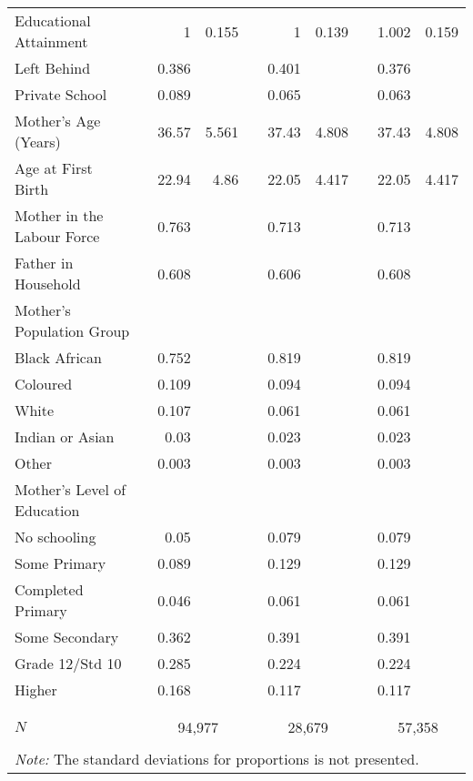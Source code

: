 \begin{table}[t!]
\begin{tabular}{llrrlrrlrr}
  Educational Attainment &  &     1 & 0.155 &  &     1 & 0.139 &  & 1.002 & 0.159 \\ 
  Left Behind &  & 0.386 &  &  & 0.401 &  &  & 0.376 &  \\ 
  Private School &  & 0.089 &  &  & 0.065 &  &  & 0.063 &  \\ 
  Mother's Age (Years) &  & 36.57 & 5.561 &  & 37.43 & 4.808 &  & 37.43 & 4.808 \\ 
  Age at First Birth &  & 22.94 &  4.86 &  & 22.05 & 4.417 &  & 22.05 & 4.417 \\ 
  Mother in the Labour Force &  & 0.763 &  &  & 0.713 &  &  & 0.713 &  \\ 
  Father in Household &  & 0.608 &  &  & 0.606 &  &  & 0.608 &  \\ 
   \multicolumn{2}{l}{Mother's Population Group} &  &  &  & & & & \\\phantom{M}Black African &  & 0.752 &  &  & 0.819 &  &  & 0.819 &  \\ 
  \phantom{M}Coloured &  & 0.109 &  &  & 0.094 &  &  & 0.094 &  \\ 
  \phantom{M}White &  & 0.107 &  &  & 0.061 &  &  & 0.061 &  \\ 
  \phantom{M}Indian or Asian &  &  0.03 &  &  & 0.023 &  &  & 0.023 &  \\ 
  \phantom{M}Other &  & 0.003 &  &  & 0.003 &  &  & 0.003 &  \\ 
   \multicolumn{2}{l}{Mother's Level of Education} &  &  &  & & & & \\\phantom{M}No schooling &  &  0.05 &  &  & 0.079 &  &  & 0.079 &  \\ 
  \phantom{M}Some Primary &  & 0.089 &  &  & 0.129 &  &  & 0.129 &  \\ 
  \phantom{M}Completed Primary &  & 0.046 &  &  & 0.061 &  &  & 0.061 &  \\ 
  \phantom{M}Some Secondary &  & 0.362 &  &  & 0.391 &  &  & 0.391 &  \\ 
  \phantom{M}Grade 12/Std 10 &  & 0.285 &  &  & 0.224 &  &  & 0.224 &  \\ 
  \phantom{M}Higher &  & 0.168 &  &  & 0.117 &  &  & 0.117 &  \\ 
    \\[-1.8ex] \hline \\[-1.8ex]  \multicolumn{2}{l}{ $ N $ }  &  \multicolumn{2}{c}{94,977} & & \multicolumn{2}{c}{28,679} & & \multicolumn{2}{c}{57,358} \\  \bottomrule   
 \\[-1.8ex] \multicolumn{10}{l}{\footnotesize{\textit{Note:} The standard deviations for proportions is 
               not presented.}} 
\end{tabular}
\end{table}
